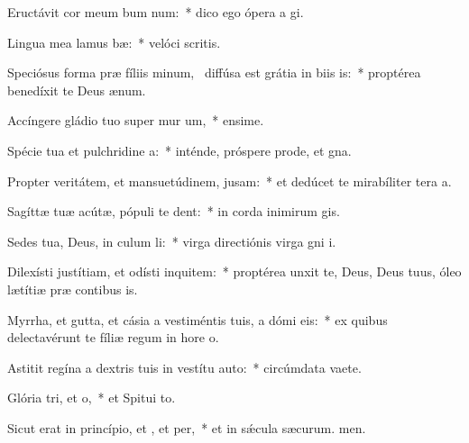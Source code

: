 \item Eructávit cor meum bum num:~* dico ego ópera a gi.
\item Lingua mea lamus bæ:~* velóci scritis.
\item Speciósus forma præ fíliis minum,~\pscross{} diffúsa est grátia in biis is:~* proptérea benedíxit te Deus  ænum.
\item Accíngere gládio tuo super mur um,~* ensime.
\item Spécie tua et pulchridine a:~* inténde, próspere prode, et gna.
\item Propter veritátem, et mansuetúdinem,  jusam:~* et dedúcet te mirabíliter tera a.
\item Sagíttæ tuæ acútæ, pópuli  te dent:~* in corda inimirum gis.
\item Sedes tua, Deus, in culum li:~* virga directiónis virga gni i.
\item Dilexísti justítiam, et odísti inquitem:~* proptérea unxit te, Deus, Deus tuus, óleo lætítiæ præ contibus is.
\item Myrrha, et gutta, et cásia a vestiméntis tuis, a dómi eis:~* ex quibus delectavérunt te fíliæ regum in hore o.
\item Astitit regína a dextris tuis in vestítu auto:~* circúmdata vaete.
\item Glória tri, et o,~* et Spitui to.
\item Sicut erat in princípio, et , et per,~* et in sǽcula sæcurum. men.
